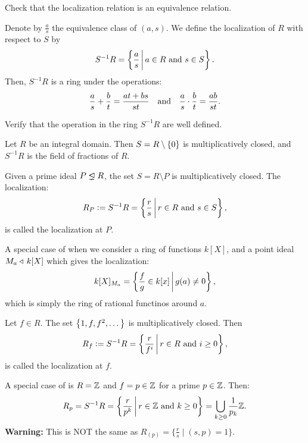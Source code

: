 \documentclass[11pt,a4paper]{article}
\begin{document}
\begin{exercise}
  Check that the localization relation is an equivalence relation.
\end{exercise}

\begin{definition}[Localization]
  Denote by $\frac{a}{s}$ the equivalence class of $(a,s)$.
  We define the localization of $R$ with respect to $S$
  by
  \[
    S^{-1}R = \left\{\frac{a}{s} \,\middle\vert\, a \in R \text{ and } s \in S\right\}.
  \]
  Then, $S^{-1} R$ is a ring under the operations:
  \[
    \frac{a}{s} +
    \frac{b}{t} =
    \frac{at + bs}{st} \quad \text{and} \quad
    \frac{a}{s} \cdot
    \frac{b}{t} =
    \frac{ab}{st}.
  \]
\end{definition}

\begin{exercise}
  Verify that the operation in the ring $S^{-1} R$ are well defined.
\end{exercise}

\begin{example}
  Let $R$ be an integral domain.
  Then $S = R\setminus\left\{0\right\}$ is multiplicatively closed,
  and $S^{-1}R$ is the field of fractions of $R$.
\end{example}

\begin{example}
  \label{exmp:localization-at-an-ideal}
  Given a prime ideal $P \properideal R$,
  the set $S = R \setminus P$ is multiplicatively closed.
  The localization:
  \[
    R_P :=
    S^{-1}R =
    \left\{\frac{r}{s} \,\middle\vert\, r \in R \text{ and } s \in S\right\},
  \]
  is called the localization at $P$.
\end{example}

\begin{remark}
  A special case of 
  when we consider a ring of functions $k[X]$,
  and a point ideal $M_a \triangleleft\, k[X]$ which gives the localization:
  \[
    k[X]_{M_a} =
    \left\{\frac{f}{g} \in k[x] \,\middle\vert\, g(a) \neq 0\right\},
  \]
  which is simply the ring of rational functinos around $a$.
\end{remark}

\begin{example}
  \label{exmp:localization-at-an-element}
  Let $f \in R$.
  The set $\left\{1,f,f^{2},\dots\right\}$ is multiplicatively closed.
  Then
  \[
    R_f := S^{-1}R =
    \left\{\frac{r}{f^i} \,\middle\vert\, r \in R \text{ and } i \geq 0\right\},
  \]
  is called the localization at $f$.
\end{example}

\begin{remark}
  A special case of 
  is $R = \mathbb{Z}$ and $f = p \in \mathbb{Z}$ for a prime $p \in \mathbb{Z}$.
  Then:
  \[
    R_p = S^{-1}R =
    \left\{\frac{r}{p^k} \,\middle\vert\, r \in \mathbb{Z} \text{ and } k \geq 0\right\} =
    \bigcup_{k \geq 0} \frac{1}{p_k} \mathbb{Z}.
  \]
  \textbf{Warning:} This is NOT the same as
  $R_{(p)} = \{\frac{r}{s} \mid (s,p) = 1\}$.
\end{remark}
\end{document}

